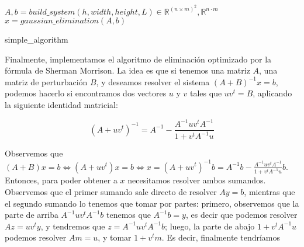 \begin{algorithm}[H]
 \vspace{0.5cm}	
	$A, b= build\_system(h, width, height,L) \in  \mathbb{R}^{(n \times m)^{2}}, \mathbb{R}^{n \cdot m}$\\
	$x = gaussian\_elimination(A,b)$\\
	\vspace{0.5cm}
	 {
	\vspace{0.5cm}
   	}
   	\vspace{0.5cm}	
\caption{simple\_algorithm\label{alg_simple_algorithm}}  
\end{algorithm} 


Finalmente, implementamos el algoritmo de eliminación optimizado por la fórmula de Sherman Morrison. La idea es que si tenemos una matriz $A$, una matriz de perturbación $B$, y deseamos resolver el sistema $(A+B)^{-1}x=b$, podemos hacerlo si encontramos dos vectores $u$ y $v$ tales que $uv^t=B$, aplicando la siguiente identidad matricial:

$$(A + uv^t)^{-1} = A^{-1} - \frac{A^{-1} u v^t A^{-1}}{1 + v^t A^{-1} u}$$

Observemos que $(A+B)x = b \iff (A + uv^t)x = b \iff x = (A + uv^t)^{-1}b = A^{-1}b - \frac{A^{-1} u v^t A^{-1}}{1 + v^t A^{-1} u}b$. Entonces, para poder obtener a $x$ necesitamos resolver ambos sumandos. Observemos que el primer sumando sale directo de resolver $Ay = b$, mientras que el segundo sumando lo tenemos que tomar por partes: primero, observemos que la parte de arriba $A^{-1} u v^t A^{-1} b$ tenemos que $A^{-1}b = y$, es decir que podemos resolver $Az = u v^t y$, y tendremos que $z = A^{-1} u v^t A^{-1} b$; luego, la parte de abajo $1 + v^t A^{-1} u$ podemos resolver $Am = u$, y tomar $1 + v^t m$. Es decir, finalmente tendríamos

